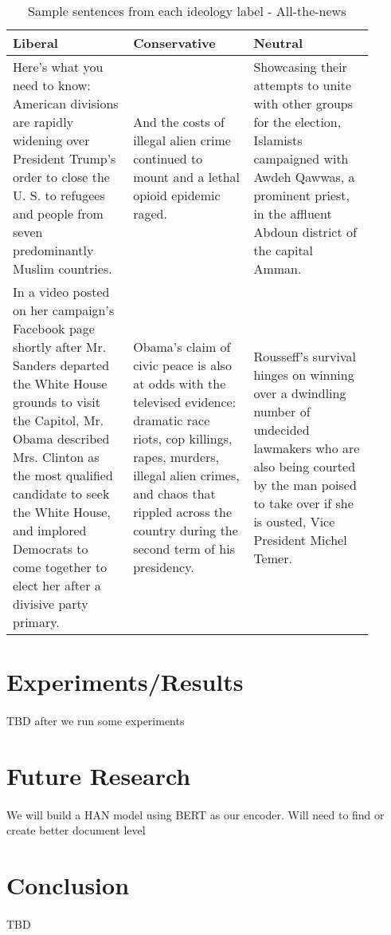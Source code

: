 \documentclass[10pt,a4paper,onecolumn]{article}
\begin{document}
\begin{table}[h!]
	\begin{center}
		\caption{Sample sentences from each ideology label - All-the-news	}
		\label{tab:atn-sentences}
		\begin{tabular}{p{0.3\linewidth}|p{0.3\linewidth}|p{0.3\linewidth}}
			\hline\hline
			\textbf{Liberal} & \textbf{Conservative} & \textbf{Neutral}\\
			\hline
			Here’s what you need to know: American divisions are rapidly widening over President Trump’s order to close the U. S. to refugees and people from seven predominantly Muslim countries. & And the costs of illegal alien crime continued to mount and a lethal opioid epidemic raged. & Showcasing their attempts to unite with other groups for the election, Islamists campaigned with Awdeh Qawwas, a prominent priest, in the affluent Abdoun district of the capital Amman. \\
			In a video posted on her campaign’s Facebook page shortly after Mr. Sanders departed the White House grounds to visit the Capitol, Mr. Obama described Mrs. Clinton as the most qualified candidate to seek the White House, and implored Democrats to come together to elect her after a divisive party primary. & Obama’s claim of civic peace is also at odds with the televised evidence: dramatic race riots, cop killings, rapes, murders, illegal alien crimes, and chaos that rippled across the country during the second term of his presidency. & Rousseff’s survival hinges on winning over a dwindling number of undecided lawmakers who are also being courted by the man poised to take over if she is ousted, Vice President Michel Temer. \\
			\hline\hline
		\end{tabular}
	\end{center}
\end{table}

\section{Experiments/Results}
\paragraph{}
TBD after we run some experiments


\section{Future Research}
\paragraph{}
We will build a HAN model using BERT as our encoder. Will need to find or create better document level 

\section{Conclusion}
\paragraph{}
TBD



\end{document}
